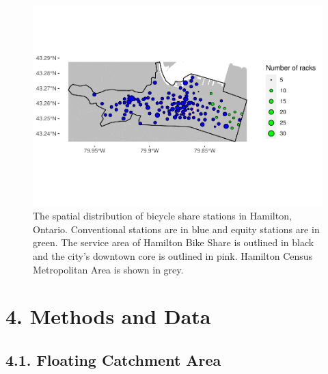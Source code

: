 \documentclass[]{elsarticle} %
\begin{document}
\begin{figure}

{\centering \includegraphics[width=1\linewidth]{Bike-share-spatial-equity_files/figure-latex/sobi-stations-in-hamilton-1} 

}

\caption{The spatial distribution of bicycle share stations in Hamilton, Ontario. Conventional stations are in blue and equity stations are in green. The service area of Hamilton Bike Share is outlined in black and the city's downtown core is outlined in pink. Hamilton Census Metropolitan Area is shown in grey.}\label{fig:sobi-stations-in-hamilton}
\end{figure}

\hypertarget{sec:methods}{%
\section{4. Methods and Data}\label{sec:methods}}

\hypertarget{floating-catchment-area}{%
\subsection{4.1. Floating Catchment
Area}\label{floating-catchment-area}}
\end{document}
